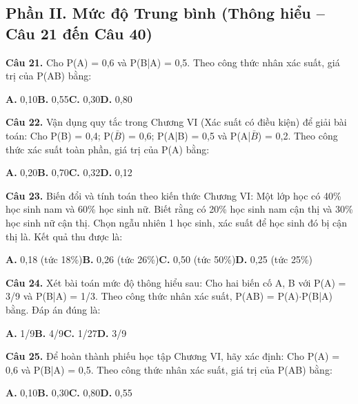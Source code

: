 \documentclass[11pt,a4paper]{article}
\begin{document}
\subsection*{\color{accent} Phần II. Mức độ Trung bình (Thông hiểu -- Câu 21 đến Câu 40)}
\textbf{\color{primary} Câu 21.} Cho P(A) = 0,6 và P(B|A) = 0,5. Theo công thức nhân xác suất, giá trị của P(AB) bằng:\par
\hspace*{1.5em}\textbf{A.} 0,10\quad\quad \textbf{B.} 0,55\quad\quad \textbf{C.} 0,30\quad\quad \textbf{D.} 0,80\par\vspace{2pt}
\textbf{\color{primary} Câu 22.} Vận dụng quy tắc trong Chương VI (Xác suất có điều kiện) để giải bài toán: Cho P(B) = 0,4; P($\bar{B}$) = 0,6; P(A|B) = 0,5 và P(A|$\bar{B}$) = 0,2. Theo công thức xác suất toàn phần, giá trị của P(A) bằng:\par
\hspace*{1.5em}\textbf{A.} 0,20\quad\quad \textbf{B.} 0,70\quad\quad \textbf{C.} 0,32\quad\quad \textbf{D.} 0,12\par\vspace{2pt}
\textbf{\color{primary} Câu 23.} Biến đổi và tính toán theo kiến thức Chương VI: Một lớp học có 40\% học sinh nam và 60\% học sinh nữ. Biết rằng có 20\% học sinh nam cận thị và 30\% học sinh nữ cận thị. Chọn ngẫu nhiên 1 học sinh, xác suất để học sinh đó bị cận thị là. Kết quả thu được là:\par
\hspace*{1.5em}\textbf{A.} 0,18 (tức 18\%)\quad\quad \textbf{B.} 0,26 (tức 26\%)\quad\quad \textbf{C.} 0,50 (tức 50\%)\quad\quad \textbf{D.} 0,25 (tức 25\%)\par\vspace{2pt}
\textbf{\color{primary} Câu 24.} Xét bài toán mức độ thông hiểu sau: Cho hai biến cố A, B với P(A) = 3/9 và P(B|A) = 1/3. Theo công thức nhân xác suất, P(AB) = P(A)$\cdot$P(B|A) bằng. Đáp án đúng là:\par
\hspace*{1.5em}\textbf{A.} 1/9\quad\quad \textbf{B.} 4/9\quad\quad \textbf{C.} 1/27\quad\quad \textbf{D.} 3/9\par\vspace{2pt}
\textbf{\color{primary} Câu 25.} Để hoàn thành phiếu học tập Chương VI, hãy xác định: Cho P(A) = 0,6 và P(B|A) = 0,5. Theo công thức nhân xác suất, giá trị của P(AB) bằng:\par
\hspace*{1.5em}\textbf{A.} 0,10\quad\quad \textbf{B.} 0,30\quad\quad \textbf{C.} 0,80\quad\quad \textbf{D.} 0,55\par\vspace{2pt}
\end{document}
